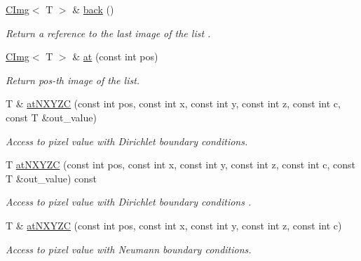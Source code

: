 \begin{DoxyCompactItemize}
\hyperlink{structcimg__library__suffixed_1_1CImg}{C\+Img}$<$ T $>$ \& \hyperlink{structcimg__library__suffixed_1_1CImgList_a872f83d16b0bc23e8e05d8d39761e3e9}{back} ()
\begin{DoxyCompactList}\small\item\em Return a reference to the last image of the list . \end{DoxyCompactList}\item 
\hyperlink{structcimg__library__suffixed_1_1CImg}{C\+Img}$<$ T $>$ \& \hyperlink{structcimg__library__suffixed_1_1CImgList_abbaca68670ef9bb45b18b7f48c79d2da}{at} (const int pos)
\begin{DoxyCompactList}\small\item\em Return pos-\/th image of the list. \end{DoxyCompactList}\item 
T \& \hyperlink{structcimg__library__suffixed_1_1CImgList_a1c1316b23ca9a215d0d8d9ca0b9fc7a6}{at\+N\+X\+Y\+ZC} (const int pos, const int x, const int y, const int z, const int c, const T \&out\+\_\+value)
\begin{DoxyCompactList}\small\item\em Access to pixel value with Dirichlet boundary conditions. \end{DoxyCompactList}\item 
\mbox{\label{structcimg__library__suffixed_1_1CImgList_ab8413990f4da9c946b2506c768d3e90b}} 
T \hyperlink{structcimg__library__suffixed_1_1CImgList_ab8413990f4da9c946b2506c768d3e90b}{at\+N\+X\+Y\+ZC} (const int pos, const int x, const int y, const int z, const int c, const T \&out\+\_\+value) const
\begin{DoxyCompactList}\small\item\em Access to pixel value with Dirichlet boundary conditions . \end{DoxyCompactList}\item 
T \& \hyperlink{structcimg__library__suffixed_1_1CImgList_aafdfbf30656305295724228c6e4f501d}{at\+N\+X\+Y\+ZC} (const int pos, const int x, const int y, const int z, const int c)
\begin{DoxyCompactList}\small\item\em Access to pixel value with Neumann boundary conditions. \end{DoxyCompactList}\item 
\mbox{\label{structcimg__library__suffixed_1_1CImgList_ab60a4caba174a05983a8f8790cb3c5cd}} 

\end{DoxyCompactItemize}
